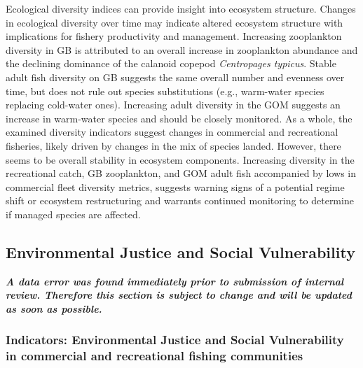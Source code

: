 \documentclass[
  10pt,
]{article}
\begin{document}
Ecological diversity indices can provide insight into ecosystem structure. Changes in ecological diversity over time may indicate altered ecosystem structure with implications for fishery productivity and management. Increasing zooplankton diversity in GB is attributed to an overall increase in zooplankton abundance and the declining dominance of the calanoid copepod \emph{Centropages typicus}. Stable adult fish diversity on GB suggests the same overall number and evenness over time, but does not rule out species substitutions (e.g., warm-water species replacing cold-water ones). Increasing adult diversity in the GOM suggests an increase in warm-water species and should be closely monitored.
As a whole, the examined diversity indicators suggest changes in commercial and recreational fisheries, likely driven by changes in the mix of species landed. However, there seems to be overall stability in ecosystem components. Increasing diversity in the recreational catch, GB zooplankton, and GOM adult fish accompanied by lows in commercial fleet diversity metrics, suggests warning signs of a potential regime shift or ecosystem restructuring and warrants continued monitoring to determine if managed species are affected.

\hypertarget{environmental-justice-and-social-vulnerability}{%
\subsection{Environmental Justice and Social Vulnerability}\label{environmental-justice-and-social-vulnerability}}

\textbf{\emph{A data error was found immediately prior to submission of internal review. Therefore this section is subject to change and will be updated as soon as possible.}}

\hypertarget{indicators-environmental-justice-and-social-vulnerability-in-commercial-and-recreational-fishing-communities}{%
\subsubsection{Indicators: Environmental Justice and Social Vulnerability in commercial and recreational fishing communities}\label{indicators-environmental-justice-and-social-vulnerability-in-commercial-and-recreational-fishing-communities}}
\end{document}
